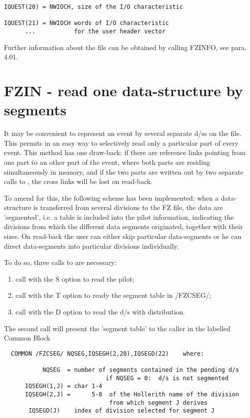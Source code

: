 {\begin{verbatim}
IQUEST(20) = NWIOCH, size of the I/O characteristic

IQUEST(21) = NWIOCH words of I/O characteristic
      ...           for the user header vector
\end{verbatim}
   Further information about the file can be obtained
   by calling FZINFO, see para. 4.01.
\spnorm

\section{FZIN - read one data-structure by segments}

It may be convenient to represent an event by several separate
d/ss on the file.
This permits in an easy way to selectively read only a particular
part of every event.
This method has one draw-back:
if there are reference links pointing from one part to an other part
of the event, where both parts are residing simultaneously in
memory, and if the two parts are written out by two separate calls to
, the cross links will be lost on read-back.

To amend for this, the following scheme has been implemented:
when a data-structure is transferred from several divisions to the
FZ file, the data are 'segmented', i.e. a table is included
into the pilot information, indicating the divisions from which
the different data segments originated, together with their sizes.
On read-back the user can either skip particular data-segments or
he can direct data-segments into particular divisions individually.

To do so, three calls to  are necessary:
\begin{enumerate}
  \item call with the S option to read the pilot;
  \item call with the T option to ready the segment table in /FZCSEG/;
  \item call with the D option to read the d/s with distribution.
\end{enumerate}

The second call will present the 'segment table' to the caller
in the labelled Common Block
\begin{verbatim}
  COMMON /FZCSEG/ NQSEG,IQSEGH(2,20),IQSEGD(22)    where:

           NQSEG  = number of segments contained in the pending d/s
                             if NQSEG = 0:  d/s is not segmented
      IQSEGH(1,J) = char 1-4
      IQSEGH(2,J) =      5-8  of the Hollerith name of the division
                              from which segment J derives
       IQSEGD(J)    index of division selected for segment J


\end{verbatim}}
